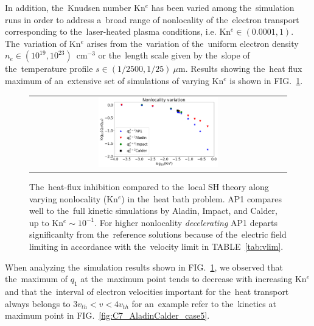\documentclass[
 aps,
 jmp,
 amsmath,amssymb,
 twocolumn,
]{revtex4-1}
\newcommand{\figref}[1]{FIG.~\ref{#1}}
\newcommand{\tabref}[1]{TABLE~\ref{#1}}
\newcommand{\figscale}{0.48}
\newcommand{\vmag}{v}
\newcommand{\vth}{v_{th}}
\begin{document}
In addition, the~Knudsen number Kn$^e$ has been varied among the~simulation 
runs in order to address a~broad range of nonlocality of 
the~electron transport corresponding 
to the~laser-heated plasma conditions, i.e. Kn$^e \in (0.0001, 1)$. 
The~variation of Kn$^e$ arises from the~variation
of the~uniform electron density $n_e \in (10^{19}, 10^{23})$~cm$^{-3}$ or 
the~length scale given by the~slope of the~temperature profile 
$s \in (1/2500, 1/25)~\mu$m. Results showing the~heat flux maximum 
of an~extensive set of simulations of
varying Kn$^e$ is shown in \figref{fig:Kn_results}.
 \begin{figure}[htb]
  \begin{center}
    \begin{tabular}{c}
      \includegraphics[width=\figscale\textwidth]{Kn_results.png}
    \end{tabular}
  \caption{  
  The~heat-flux inhibition compared to the~local SH theory along varying
  nonlocality (Kn$^e$) in the~heat bath problem. AP1 compares well to 
  the~full kinetic simulations by Aladin, Impact, and Calder, up to 
  Kn$^e \sim 10^{-1}$. For higher nonlocality \textit{decelerating} 
  AP1 departs significanlty from the~reference solutions because of
  the~electric field limiting in accordance with the~velocity limit in 
  \tabref{tab:vlim}. 
  }
  \label{fig:Kn_results}
  \end{center} 
\end{figure}
When analyzing the~simulation results shown in \figref{fig:Kn_results}, 
we observed that 
the~maximum of $q_1$ at the~maximum point tends to decrease with increasing 
Kn$^e$ and that the~interval of electron velocities important for 
the~heat transport always belongs to $3 \vth < \vmag <4 \vth$ for an~example
refer to the~kinetics at maximum point in \figref{fig:C7_AladinCalder_case5}. 
\end{document}
